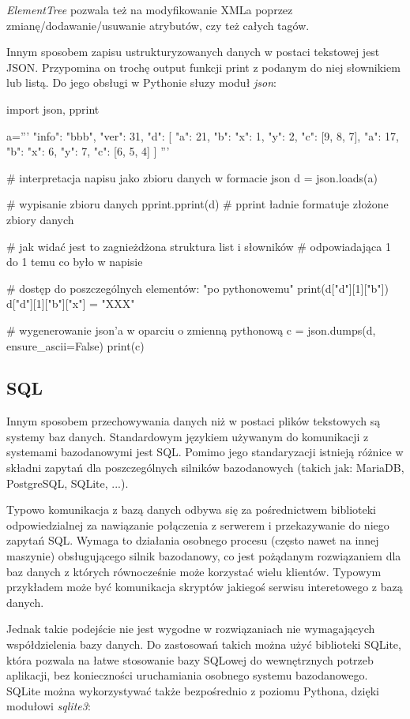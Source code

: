 \documentclass{pdfBooklets}
\begin{document}
\textit{ElementTree} pozwala też na modyfikowanie XMLa poprzez zmianę/dodawanie/usuwanie atrybutów, czy też całych tagów.

Innym sposobem zapisu ustrukturyzowanych danych w postaci tekstowej jest JSON. Przypomina on trochę output funkcji print z podanym do niej słownikiem lub listą. Do jego obsługi w Pythonie słuzy moduł \textit{json}:

\begin{CodeFrame*}[python]{}
import json, pprint

a='''{
	"info": "bbb",
	"ver": 31,
	"d": [
		{"a": 21, "b": {"x": 1, "y": 2}, "c": [9, 8, 7]},
		{"a": 17, "b": {"x": 6, "y": 7}, "c": [6, 5, 4]}
	]
}'''

# interpretacja napisu jako zbioru danych w formacie json
d = json.loads(a)

# wypisanie zbioru danych
pprint.pprint(d) # pprint ładnie formatuje złożone zbiory danych

# jak widać jest to zagnieżdżona struktura list i słowników
# odpowiadająca 1 do 1 temu co było w napisie

# dostęp do poszczególnych elementów: "po pythonowemu"
print(d["d"][1]["b"])
d["d"][1]["b"]["x"] = "XXX"

# wygenerowanie json'a w oparciu o zmienną pythonową
c = json.dumps(d, ensure_ascii=False)
print(c)
\end{CodeFrame*}

\subsection{SQL}

Innym sposobem przechowywania danych niż w postaci plików tekstowych są systemy baz danych.
Standardowym językiem używanym do komunikacji z systemami bazodanowymi jest SQL.
Pomimo jego standaryzacji istnieją różnice w składni zapytań dla poszczególnych silników bazodanowych (takich jak: MariaDB, PostgreSQL, SQLite, ...).

Typowo komunikacja z bazą danych odbywa się za pośrednictwem biblioteki odpowiedzialnej za nawiązanie połączenia z serwerem i przekazywanie do niego zapytań SQL.
Wymaga to działania osobnego procesu (często nawet na innej maszynie) obsługującego silnik bazodanowy, co jest pożądanym rozwiązaniem dla baz danych z których równocześnie może korzystać wielu klientów.
Typowym przykładem może być komunikacja skryptów jakiegoś serwisu interetowego z bazą danych.

Jednak takie podejście nie jest wygodne w rozwiązaniach nie wymagających współdzielenia bazy danych.
Do zastosowań takich można użyć biblioteki SQLite, która pozwala na łatwe stosowanie bazy SQLowej do wewnętrznych potrzeb aplikacji, bez konieczności uruchamiania osobnego systemu bazodanowego.
SQLite można wykorzystywać także bezpośrednio z poziomu Pythona, dzięki modułowi \textit{sqlite3}:
\end{document}
